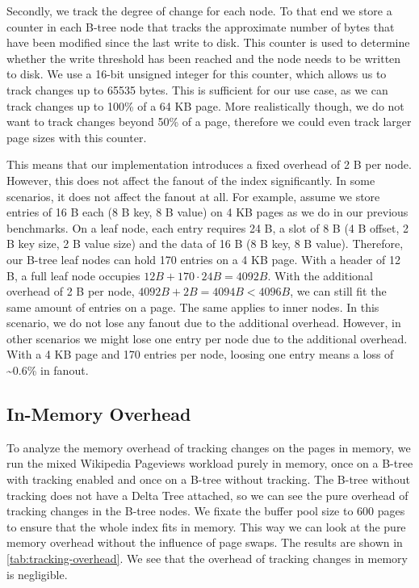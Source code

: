 Secondly, we track the degree of change for each node.
To that end we store a counter in each B-tree node that tracks the approximate number of bytes that have been modified since the last write to disk.
This counter is used to determine whether the write threshold has been reached and the node needs to be written to disk.
We use a 16-bit unsigned integer for this counter, which allows us to track changes up to 65535 bytes.
This is sufficient for our use case, as we can track changes up to 100\% of a 64 KB page.
More realistically though, we do not want to track changes beyond 50\% of a page, therefore we could even track larger page sizes with this counter.

This means that our implementation introduces a fixed overhead of 2 B per node.
However, this does not affect the fanout of the index significantly.
In some scenarios, it does not affect the fanout at all.
For example, assume we store entries of 16 B each (8 B key, 8 B value) on 4 KB pages as we do in our previous benchmarks.
On a leaf node, each entry requires 24 B, a slot of 8 B (4 B offset, 2 B key size, 2 B value size) and the data of 16 B (8 B key, 8 B value).
Therefore, our B-tree leaf nodes can hold 170 entries on a 4 KB page.
With a header of 12 B, a full leaf node occupies $12 B + 170 \cdot 24 B = 4092 B$.
With the additional overhead of 2 B per node, $ 4092 B + 2 B = 4094 B < 4096 B$, we can still fit the same amount of entries on a page.
The same applies to inner nodes.
In this scenario, we do not lose any fanout due to the additional overhead.
However, in other scenarios we might lose one entry per node due to the additional overhead.
With a 4 KB page and 170 entries per node, loosing one entry means a loss of \textasciitilde0.6\% in fanout.

\subsection{In-Memory Overhead}
\label{sec:in-memory-overhead}
To analyze the memory overhead of tracking changes on the pages in memory, we run the mixed Wikipedia Pageviews workload purely in memory, once on a B-tree with tracking enabled and once on a B-tree without tracking.
The B-tree without tracking does not have a Delta Tree attached, so we can see the pure overhead of tracking changes in the B-tree nodes.
We fixate the buffer pool size to 600 pages to ensure that the whole index fits in memory.
This way we can look at the pure memory overhead without the influence of page swaps.
The results are shown in \autoref{tab:tracking-overhead}.
We see that the overhead of tracking changes in memory is negligible.

